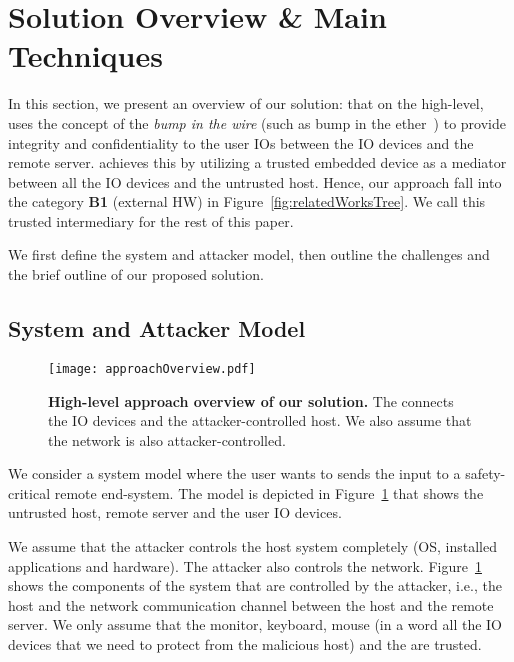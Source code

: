 \section{Solution Overview \& Main Techniques}
\label{sec:approach}

In this section, we present an overview of our solution: \name that on the high-level, uses the concept of the \emph{bump in the wire} (such as bump in the ether~\cite{McCPerRei2006}) to provide integrity and confidentiality to the user IO{}s between the IO devices and the remote server. \name achieves this by utilizing a trusted embedded device as a mediator between all the IO devices and the untrusted host. Hence, our approach fall into the category \textbf{B1} (external HW) in Figure~\ref{fig:relatedWorksTree}. We call this trusted intermediary \device for the rest of this paper.   %

We first define the system and attacker model, then outline the challenges and the brief outline of our proposed solution.



\subsection{System and Attacker Model}
\label{sec:approach:systemAttackerModel}


\begin{figure}[t]
\centering
\texttt{[image: approachOverview.pdf]}
\caption{\textbf{High-level approach overview of our solution.}  The \device connects the IO devices and the attacker-controlled host. We also assume that the network is also attacker-controlled.}
\spacesave
\label{fig:approachOverview}
\centering
\end{figure}


We consider a system model where the user wants to sends the input to a safety-critical remote end-system. The model is depicted in Figure~\ref{fig:approachOverview} that shows the untrusted host, remote server and the user IO devices. 

We assume that the attacker controls the host system completely (OS, installed applications and hardware). The attacker also controls the network. %
Figure~\ref{fig:approachOverview} shows the components of the system that are controlled by the attacker, i.e., the host and the network communication channel between the host and the remote server. We only assume that the monitor, keyboard, mouse (in a word all the IO devices that we need to protect from the malicious host) and the \device are trusted.

